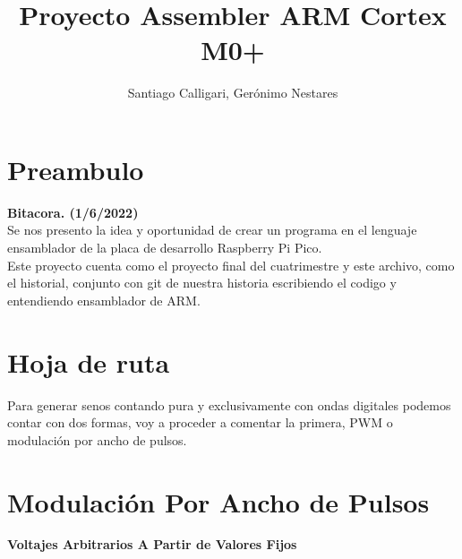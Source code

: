 \documentclass[]{article}
\title{Proyecto Assembler ARM Cortex M0+}
\author{Santiago Calligari, Gerónimo Nestares}
\begin{document}
\maketitle


\section*{Preambulo}
\textbf{\scriptsize{Bitacora. (1/6/2022)}}\\
Se nos presento la idea y oportunidad de crear un programa en el lenguaje ensamblador de la placa de desarrollo Raspberry Pi Pico. \\
Este proyecto cuenta como el proyecto final del cuatrimestre y este archivo, como el historial, conjunto con git de nuestra historia escribiendo el codigo y entendiendo ensamblador de ARM.	


\section*{Hoja de ruta}
Para generar senos contando pura y exclusivamente con ondas digitales podemos contar con dos formas, voy a proceder a comentar la primera, PWM o modulación por ancho de pulsos.


\section*{Modulación Por Ancho de Pulsos}
\textbf{\scriptsize{Voltajes Arbitrarios A Partir de Valores Fijos}}\\
\end{document}
